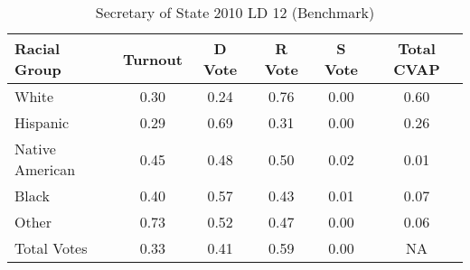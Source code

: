 \begin{table}[htb]
\begin{center}
\caption{Secretary of State 2010 LD 12 (Benchmark)}
\label{sos10_cvap_ld_12_benchmark}
\begin{tabular}{lccccc}
  \hline
Racial Group & Turnout & D Vote & R Vote & S Vote & Total CVAP \\ 
  \hline
White & 0.30  & 0.24  & 0.76  & 0.00  & 0.60 \\
    Hispanic & 0.29  & 0.69  & 0.31  & 0.00  & 0.26 \\
    Native American & 0.45  & 0.48  & 0.50  & 0.02  & 0.01 \\
    Black & 0.40  & 0.57  & 0.43  & 0.01  & 0.07 \\
    Other & 0.73  & 0.52  & 0.47  & 0.00  & 0.06 \\
    Total Votes & 0.33  & 0.41  & 0.59  & 0.00  &  NA \\
   \hline
\end{tabular}
\end{center}
\end{table}
